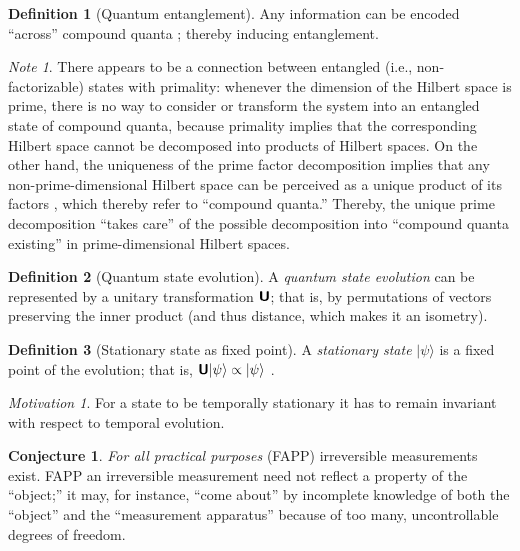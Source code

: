 \documentclass[%
  preprint,
 showpacs,
 showkeys,
 preprintnumbers,
 amsmath,amssymb,
 aps,
 prl,
  longbibliography,
 ]{revtex4-1}
\theoremstyle{definition}
\newtheorem{definition}{Definition}
\newtheorem{conjecture}{Conjecture}
\theoremstyle{remark}
\newtheorem*{motivation}{Motivation}
\newtheorem*{note}{Note}
\begin{document}
\begin{definition}[Quantum entanglement]
Any information can be encoded ``across'' compound quanta \cite{zeil-99,zeil-bruk-02,zeil-bruk-99}; thereby inducing entanglement.
\end{definition}
\begin{note}
There appears to be a connection between entangled (i.e., non-factorizable) states with primality:
whenever the dimension of the Hilbert space is prime, there is no way to consider or transform
the system into an entangled state of compound quanta,
because primality implies that the corresponding Hilbert space cannot be decomposed into products of Hilbert spaces.
On the other hand, the uniqueness of the prime factor decomposition implies that any non-prime-dimensional Hilbert space can be perceived
as a unique product of its factors \cite{Schwinger.60,Ellinas-99,Revzen-06,PhysRevA.78.012101,Simkhovich-10},
which thereby refer to ``compound quanta.''
Thereby, the unique prime decomposition
``takes care'' of the possible decomposition into ``compound quanta existing'' in prime-dimensional Hilbert spaces.
\end{note}


\begin{definition}[Quantum state evolution]
A {\em quantum state evolution}
can be represented by a unitary transformation $\textsf{\textbf{U}}$;
that is, by permutations of vectors preserving the inner product (and thus distance, which makes it an isometry).
\end{definition}

\begin{definition}[Stationary state as fixed point]
A {\em stationary state} $ | \psi \rangle$ is a fixed point of the evolution;
that is, $\textsf{\textbf{U}} | \psi \rangle \propto  | \psi \rangle$ .
\end{definition}
\begin{motivation}
For a state to be temporally stationary it has to remain invariant with respect to temporal evolution.
\end{motivation}

\begin{conjecture}
{\em For all practical purposes} (FAPP) \cite{bell-a}  irreversible measurements exist.
FAPP an irreversible measurement need not reflect a property of the ``object;''
it may, for instance, ``come about'' by incomplete knowledge of both the ``object''
and the ``measurement apparatus''  because of too many, uncontrollable degrees of freedom.
\end{conjecture}
\end{document}
